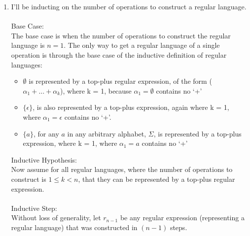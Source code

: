 
\usepackage{amsmath}

\oddsidemargin 0in
\evensidemargin 0in
\textwidth 6.5in
\topmargin -0.5in
\textheight 9.0in
\newcommand{\norm}[1]{\left\lVert #1 \right\rVert}


\pagestyle{myheadings}

\begin{enumerate}
\item
  I'll be inducting on the number of operations to construct a regular language.\\\\

  Base Case:\\
  The base case is when the number of operations to construct the regular language is $n = 1$. The only way to get a regular language of a single operation is through the base case of the inductive definition of regular languages:
  \begin{itemize}
  \item $\emptyset$ is represented by a top-plus regular expression, of the form ($\alpha_1 + \ldots + \alpha_k$), where k = 1, because $\alpha_1 = \emptyset$ contains no `+'
  \item $\{\epsilon\}$, is also represented by a top-plus expression, again where k = 1, where $\alpha_1 = \epsilon$ contains no `+'.
  \item $\{a\}$, for any $a$ in any arbitrary alphabet, $\Sigma$, is represented by a top-plus expression, where k = 1, where $\alpha_1 = a$ contains no `+'
  \end{itemize}
  Inductive Hypothesis:\\
  Now assume for all regular languages, where the number of operations to construct is $1 \leq k < n$, that they can be represented by a top-plus regular expression.\\\\
  Inductive Step:\\
  Without loss of generality, let $r_{n-1}$ be any regular expression (representing a regular language) that was constructed in $(n-1)$ steps.
  

\end{enumerate}
